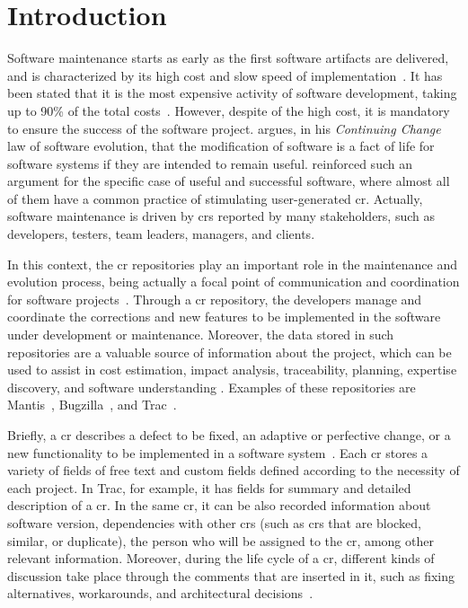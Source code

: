 \chapter{Introduction}
\label{chp:introduction}


Software maintenance starts as early as the first software artifacts are
delivered, and is characterized by its high cost and slow speed of
implementation~\citep{swebok2004}. It has been stated that it is the most
expensive activity of software development, taking up to 90\% of the total
costs~\citep{Eastwood1993,Erlikh2000}. However, despite of the high cost, it is
mandatory to ensure the success of the software project. \citet{Lehman1980}
argues, in his \emph{Continuing Change} law of software evolution, that the
modification of software is a fact of life for software systems if they are
intended to remain useful. \citet{Bennett2000} reinforced such an argument for
the specific case of useful and successful software, where almost all of them
have a common practice of stimulating user-generated \ac{cr}. Actually, software
maintenance is driven by \acp{cr} reported by many stakeholders, such as
developers, testers, team leaders, managers, and clients.

In this context, the \ac{cr} repositories play an important role in the
maintenance and evolution process, being actually a focal point of communication
and coordination for software projects~\citep{Bertram2010}. Through a \ac{cr}
repository, the developers manage and coordinate the corrections and new
features to be implemented in the software under development or maintenance.
Moreover, the data stored in such repositories are a valuable source of
information about the project, which can be used to assist in cost estimation,
impact analysis, traceability, planning, expertise discovery, and software
understanding \citep{CavalcantiSQJ2011}. Examples of these repositories are
Mantis~\citep{Mantis}, Bugzilla~\citep{Bugzilla}, and Trac~\citep{Trac}.

Briefly, a \ac{cr} describes a defect to be fixed, an adaptive or perfective
change, or a new functionality to be implemented in a software
system~\citep{CavalcantiSQJ2011}. Each \ac{cr} stores a variety of fields of
free text and custom fields defined according to the necessity of each project.
In Trac, for example, it has fields for summary and detailed description of a
\ac{cr}. In the same \ac{cr}, it can be also recorded information about software
version, dependencies with other \acp{cr} (such as \acp{cr} that are blocked,
similar, or duplicate), the person who will be assigned to the \ac{cr}, among
other relevant information. Moreover, during the life cycle of a \ac{cr},
different kinds of discussion take place through the comments that are inserted
in it, such as fixing alternatives, workarounds, and architectural
decisions~\citep{Bertram2010}.

